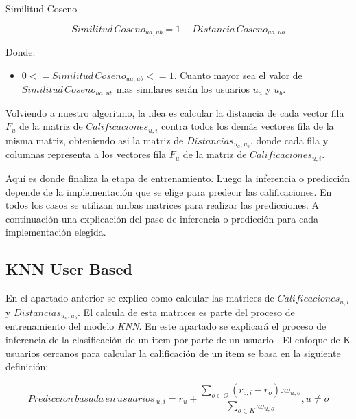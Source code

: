 \documentclass[11pt,a4paper,twoside]{thesis}
\begin{document}
\clearpage
\begin{description}
	\item[Similitud Coseno]
\end{description}
\begin{equation}
	Similitud \mspace{3mu}Coseno_{ua, ub} = 1- Distancia \mspace{3mu}Coseno_{ua, ub}
\end{equation}
\begin{description}
	\item[Donde:]
\end{description}
\begin{itemize}
	\item $0 <= Similitud \mspace{3mu}Coseno_{ua, ub} <= 1$. Cuanto mayor sea el valor de $Similitud \mspace{3mu}Coseno_{ua, ub}$ mas similares serán los usuarios $u_a$ y $u_b$.
\end{itemize}


Volviendo a nuestro algoritmo, la idea es calcular la distancia de cada vector fila $F_u$ de la matriz de $Calificaciones_{u,i}$ contra todos los demás vectores fila de la misma matriz, obteniendo asi la matriz de $Distancias_{u_a,u_b}$, donde cada fila y columnas representa a los vectores fila $F_u$ de la matriz de $Calificaciones_{u,i}$. 

Aquí es donde finaliza la etapa de entrenamiento. Luego la inferencia o predicción depende de la implementación que se elige para predecir las calificaciones. En todos los casos se utilizan ambas matrices para realizar las predicciones. A continuación una explicación del paso de inferencia o predicción para cada implementación elegida.

\clearpage

\subsection{KNN User Based}

En el apartado anterior se explico como calcular las matrices de $Calificaciones_{u,i}$ y $Distancias_{u_a,u_b}$. El calcula de esta matrices es parte del proceso de entrenamiento del modelo \textit{KNN}. En este apartado se explicará el proceso de inferencia de la clasificación de un item por parte de un usuario \cite{useritembasedinference}. El enfoque de K usuarios cercanos para calcular la calificación de un item se basa en la siguiente definición:

\begin{equation}
	Prediccion \mspace{3mu}basada \mspace{3mu}en \mspace{3mu}usuarios\mspace{3mu}_{u, i} = \overline{r}_{u} + \frac{\sum_{o \in O} (r_{o, i} - \overline{r}_o) . w_{u, o} }{ \sum_{o \in K} w_{u, o}}, u \neq o
\end{equation}
\end{document}
